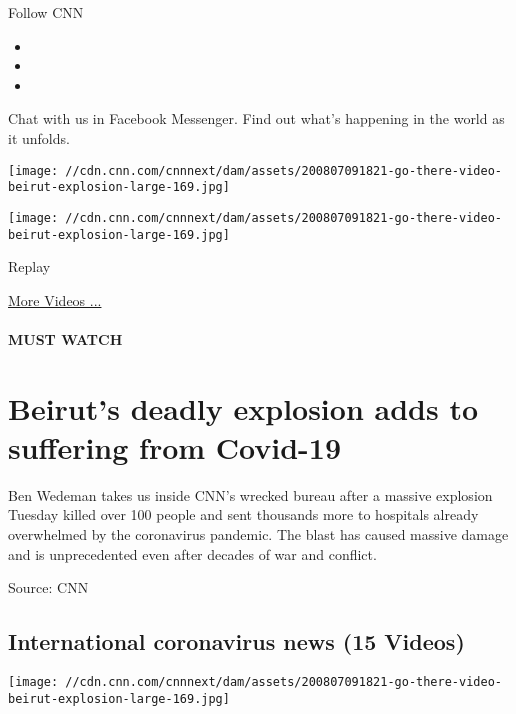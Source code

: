 Follow CNN

\begin{itemize}
\item
\item
\item
\end{itemize}

Chat with us in Facebook Messenger. Find out what's happening in the
world as it unfolds.

\texttt{[image: //cdn.cnn.com/cnnnext/dam/assets/200807091821-go-there-video-beirut-explosion-large-169.jpg]}

\texttt{[image: //cdn.cnn.com/cnnnext/dam/assets/200807091821-go-there-video-beirut-explosion-large-169.jpg]}\href{javascript:void(0);}{}

Replay

\href{/videos}{More Videos ...}

\hypertarget{must-watch}{%
\paragraph{MUST WATCH}\label{must-watch}}

\hypertarget{beiruts-deadly-explosion-adds-to-suffering-from-covid-19}{%
\section{Beirut's deadly explosion adds to suffering from
Covid-19}\label{beiruts-deadly-explosion-adds-to-suffering-from-covid-19}}

Ben Wedeman takes us inside CNN's wrecked bureau after a massive
explosion Tuesday killed over 100 people and sent thousands more to
hospitals already overwhelmed by the coronavirus pandemic. The blast has
caused massive damage and is unprecedented even after decades of war and
conflict.

Source: CNN

\hypertarget{international-coronavirus-news-15-videos}{%
\subsection{International coronavirus news (15
Videos)}\label{international-coronavirus-news-15-videos}}

\href{/videos/world/2020/08/07/beirut-explosion-amplifies-coronavirus-economic-struggles-go-there.cnn/video/playlists/coronavirus-intl/}{}

\texttt{[image: //cdn.cnn.com/cnnnext/dam/assets/200807091821-go-there-video-beirut-explosion-large-169.jpg]}


